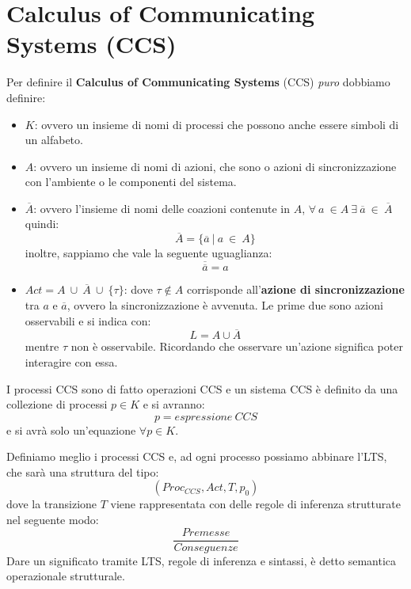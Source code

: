 \section{Calculus of Communicating Systems (CCS)}
\begin{definizione}
    Per definire il \textbf{Calculus of Communicating Systems} (CCS) \textit{puro}
    dobbiamo definire:
    \begin{itemize}
        \item  $K$: ovvero un insieme di nomi di processi che possono anche essere
              simboli di un alfabeto.
        \item  $A$: ovvero un insieme di nomi di azioni, che sono o azioni di
              sincronizzazione con l'ambiente o le componenti del sistema.
        \item $\overline{A}$: ovvero l'insieme di nomi delle coazioni contenute
              in $A$, $\forall \ a \ \in A \ \exists \ \overline{a} \ \in \ \overline{A}$
              quindi:
              \begin{equation}
                  \overline{A} = \{\overline{a} \ | \ a \ \in \ A\}
              \end{equation}
              inoltre, sappiamo che vale la seguente uguaglianza:
              \begin{equation}
                  \overline{\overline{a}} = a
              \end{equation}
        \item $Act = A \ \cup  \ \overline{A} \ \cup \ \{\tau\}$: dove $\tau \notin A$
              corrisponde all'\textbf{azione di sincronizzazione} tra $a$ e $\overline{a}$,
              ovvero la sincronizzazione è avvenuta. Le prime due sono azioni osservabili
              e si indica con: $$L = A \cup \overline{A}$$ mentre $\tau$ non è
              osservabile. Ricordando che osservare un'azione significa poter
              interagire con essa.
    \end{itemize}
\end{definizione}
\begin{definizione}
    I processi CCS sono di fatto operazioni CCS e un sistema CCS è definito da
    una collezione di processi $p \in K$ e si avranno: $$p = espressione \ CCS$$
    e si avrà solo un'equazione $\forall p \in K$.
\end{definizione}
Definiamo meglio i processi CCS e, ad ogni processo possiamo abbinare l'LTS, che sarà
una struttura del tipo:
\begin{equation}
    (Proc_{CCS}, Act, T, p_0)
\end{equation}
dove la transizione $T$ viene rappresentata con delle regole di inferenza strutturate
nel seguente modo:
\begin{equation}
    \frac{Premesse}{Conseguenze}
\end{equation}
Dare un significato tramite LTS, regole di inferenza e sintassi, è detto
semantica operazionale strutturale.

